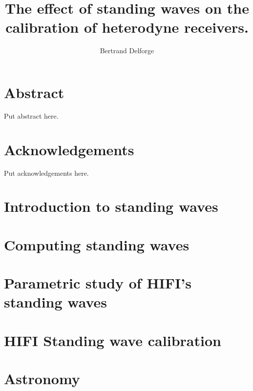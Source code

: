 \documentclass[a4paper,11pt]{book}
\title{The effect of standing waves on the calibration of heterodyne receivers.}
\author{Bertrand Delforge}
\begin{document}
\frontmatter
\maketitle
\tableofcontents
\newpage

\listoffigures
\newpage

\clearpage
\chapter{Abstract}
Put abstract here.

\clearpage
\chapter{Acknowledgements}
Put acknowledgements here.
\mainmatter

\cleardoublepage
\chapter{Introduction to standing waves}

\cleardoublepage
\chapter{Computing standing waves}

\cleardoublepage
\chapter{Parametric study of HIFI's standing waves}

\cleardoublepage
\chapter{HIFI Standing wave calibration}

\cleardoublepage
\chapter{Astronomy}

\backmatter

\cleardoublepage
{}
\printindex

\cleardoublepage
{}


\end{document}
